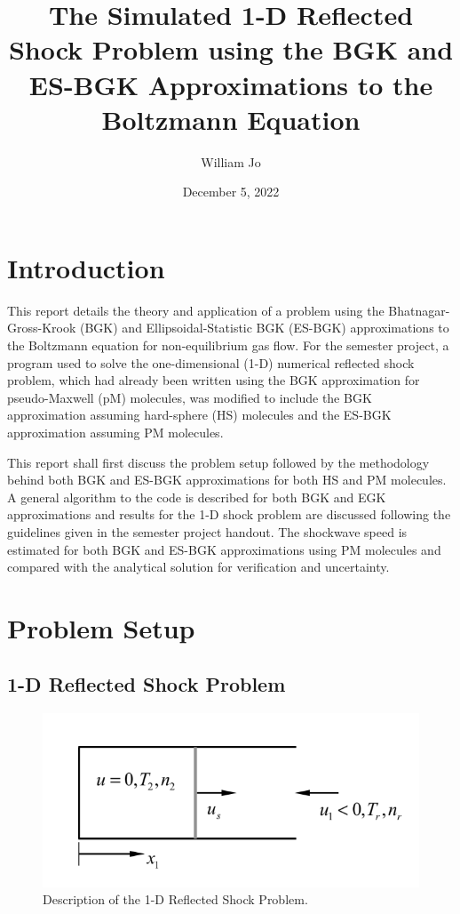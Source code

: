 \documentclass[a4paper]{article}
\title{The Simulated 1-D Reflected Shock Problem using the BGK and ES-BGK Approximations to the Boltzmann Equation}
\author{William Jo}
\date{December 5, 2022}
\begin{document}
\maketitle

\section{Introduction}
This report details the theory and application of a problem using the Bhatnagar-Gross-Krook (BGK) and Ellipsoidal-Statistic BGK (ES-BGK) approximations to the Boltzmann equation for non-equilibrium gas flow. For the semester project, a program used to solve the one-dimensional (1-D) numerical reflected shock problem, which had already been written using the BGK approximation for pseudo-Maxwell (pM) molecules, was modified to include the BGK approximation assuming hard-sphere (HS) molecules and the ES-BGK approximation assuming PM molecules. 

This report shall first discuss the problem setup followed by the methodology behind both BGK and ES-BGK approximations for both HS and PM molecules. A general algorithm to the code is described for both BGK and EGK approximations and results for the 1-D shock problem are discussed following the guidelines given in the semester project handout. The shockwave speed is estimated for both BGK and ES-BGK approximations using PM molecules and compared with the analytical solution for verification and uncertainty.

\section{Problem Setup}
\subsection{1-D Reflected Shock Problem}

\begin{figure}[hbt!]
    \centering
    \includegraphics[width=14cm]{imgs/Setup.png}
    \caption{Description of the 1-D Reflected Shock Problem.}
    \label{fig1}
\end{figure}
\end{document}
